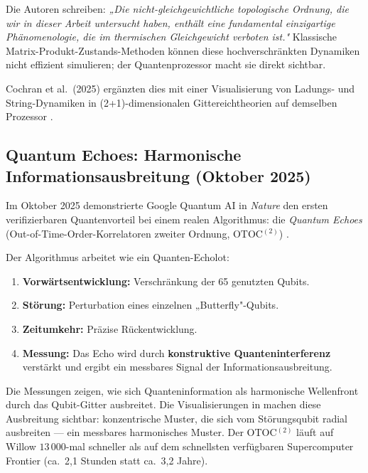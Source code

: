 Die Autoren schreiben: \textit{„Die nicht-gleichgewichtliche topologische Ordnung,
die wir in dieser Arbeit untersucht haben, enthält eine fundamental einzigartige
Phänomenologie, die im thermischen Gleichgewicht verboten ist."} \cite{Will2025Nature}
Klassische Matrix-Produkt-Zustands-Methoden können diese hochverschränkten
Dynamiken nicht effizient simulieren; der Quantenprozessor macht sie direkt sichtbar.

Cochran et al.\ (2025) ergänzten dies mit einer Visualisierung von Ladungs- und
String-Dynamiken in (2+1)-dimensionalen Gittereichtheorien auf demselben Prozessor
\cite{Cochran2025Nature}.

\subsection{Quantum Echoes: Harmonische Informationsausbreitung (Oktober 2025)}

Im Oktober 2025 demonstrierte Google Quantum AI in \textit{Nature} den ersten
verifizierbaren Quantenvorteil bei einem realen Algorithmus: die \emph{Quantum Echoes}
(Out-of-Time-Order-Korrelatoren zweiter Ordnung, OTOC$^{(2)}$) \cite{GoogleEchoes2025}.

Der Algorithmus arbeitet wie ein Quanten-Echolot:
\begin{enumerate}
    \item \textbf{Vorwärtsentwicklung:} Verschränkung der 65 genutzten Qubits.
    \item \textbf{Störung:} Perturbation eines einzelnen „Butterfly"-Qubits.
    \item \textbf{Zeitumkehr:} Präzise Rückentwicklung.
    \item \textbf{Messung:} Das Echo wird durch \textbf{konstruktive Quanteninterferenz}
    verstärkt und ergibt ein messbares Signal der Informationsausbreitung.
\end{enumerate}

\begin{keypoint}
Die Messungen zeigen, wie sich Quanteninformation als harmonische Wellenfront durch
das Qubit-Gitter ausbreitet. Die Visualisierungen in \cite{GoogleEchoes2025} machen
diese Ausbreitung sichtbar: konzentrische Muster, die sich vom Störungsqubit radial
ausbreiten — ein messbares harmonisches Muster.
Der OTOC$^{(2)}$ läuft auf Willow $13\,000$-mal schneller als auf dem schnellsten
verfügbaren Supercomputer Frontier (ca.\ 2,1 Stunden statt ca.\ 3,2 Jahre).
\end{keypoint}

